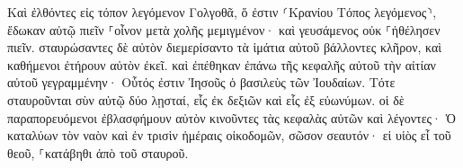 \documentclass{openreader}
\begin{document}
Καὶ ἐλθόντες εἰς τόπον λεγόμενον Γολγοθᾶ, ὅ ἐστιν ⸂Κρανίου Τόπος λεγόμενος⸃, 
ἔδωκαν αὐτῷ πιεῖν ⸀οἶνον μετὰ χολῆς μεμιγμένον· καὶ γευσάμενος οὐκ ⸀ἠθέλησεν πιεῖν. 
σταυρώσαντες δὲ αὐτὸν διεμερίσαντο τὰ ἱμάτια αὐτοῦ βάλλοντες κλῆρον, 
καὶ καθήμενοι ἐτήρουν αὐτὸν ἐκεῖ. 
καὶ ἐπέθηκαν ἐπάνω τῆς κεφαλῆς αὐτοῦ τὴν αἰτίαν αὐτοῦ γεγραμμένην· Οὗτός ἐστιν Ἰησοῦς ὁ βασιλεὺς τῶν Ἰουδαίων. 
Τότε σταυροῦνται σὺν αὐτῷ δύο λῃσταί, εἷς ἐκ δεξιῶν καὶ εἷς ἐξ εὐωνύμων. 
οἱ δὲ παραπορευόμενοι ἐβλασφήμουν αὐτὸν κινοῦντες τὰς κεφαλὰς αὐτῶν 
καὶ λέγοντες· Ὁ καταλύων τὸν ναὸν καὶ ἐν τρισὶν ἡμέραις οἰκοδομῶν, σῶσον σεαυτόν· εἰ υἱὸς εἶ τοῦ θεοῦ, ⸀κατάβηθι ἀπὸ τοῦ σταυροῦ. 
\end{document}
